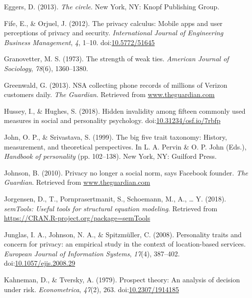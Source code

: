 \documentclass[man,floatsintext]{apa6}
\begin{document}
\leavevmode\hypertarget{ref-Eggers.2013}{}%
Eggers, D. (2013). \emph{The circle}. New York, NY: Knopf Publishing Group.

\leavevmode\hypertarget{ref-Fife.2012}{}%
Fife, E., \& Orjuel, J. (2012). The privacy calculus: Mobile apps and user perceptions of privacy and security. \emph{International Journal of Engineering Business Management}, \emph{4}, 1--10. doi:\href{https://doi.org/10.5772/51645}{10.5772/51645}

\leavevmode\hypertarget{ref-Granovetter.1973}{}%
Granovetter, M. S. (1973). The strength of weak ties. \emph{American Journal of Sociology}, \emph{78}(6), 1360--1380.

\leavevmode\hypertarget{ref-Greenwald.2013}{}%
Greenwald, G. (2013). NSA collecting phone records of millions of Verizon customers daily. \emph{The Guardian}. Retrieved from \url{www.theguardian.com}

\leavevmode\hypertarget{ref-Hussey.2018}{}%
Hussey, I., \& Hughes, S. (2018). Hidden invalidity among fifteen commonly used measures in social and personality psychology. doi:\href{https://doi.org/10.31234/osf.io/7rbfp}{10.31234/osf.io/7rbfp}

\leavevmode\hypertarget{ref-John.1999}{}%
John, O. P., \& Srivastava, S. (1999). The big five trait taxonomy: History, measurement, and theoretical perspectives. In L. A. Pervin \& O. P. John (Eds.), \emph{Handbook of personality} (pp. 102--138). New York, NY: Guilford Press.

\leavevmode\hypertarget{ref-Johnson.2010}{}%
Johnson, B. (2010). Privacy no longer a social norm, says Facebook founder. \emph{The Guardian}. Retrieved from \url{www.theguardian.com}

\leavevmode\hypertarget{ref-R-semTools}{}%
Jorgensen, D., T., Pornprasertmanit, S., Schoemann, M., A., \ldots{} Y. (2018). \emph{semTools: Useful tools for structural equation modeling}. Retrieved from \url{https://CRAN.R-project.org/package=semTools}

\leavevmode\hypertarget{ref-Junglas.2008}{}%
Junglas, I. A., Johnson, N. A., \& Spitzmüller, C. (2008). Personality traits and concern for privacy: an empirical study in the context of location-based services. \emph{European Journal of Information Systems}, \emph{17}(4), 387--402. doi:\href{https://doi.org/10.1057/ejis.2008.29}{10.1057/ejis.2008.29}

\leavevmode\hypertarget{ref-Kahneman.1979}{}%
Kahneman, D., \& Tversky, A. (1979). Prospect theory: An analysis of decision under risk. \emph{Econometrica}, \emph{47}(2), 263. doi:\href{https://doi.org/10.2307/1914185}{10.2307/1914185}
\end{document}
